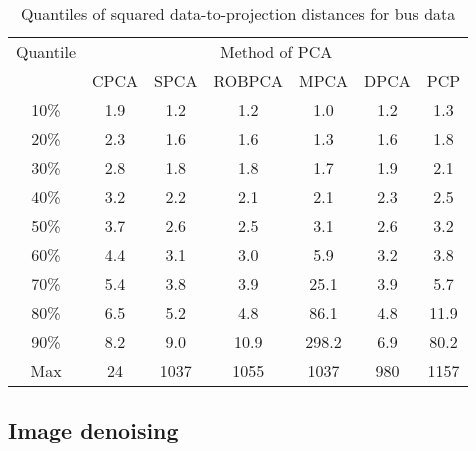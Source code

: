 
\begin{table}[t]
\centering
    \begin{tabular}{c|cccccc}
    \hline
    Quantile & \multicolumn{6}{c}{Method of PCA}         \\ \cline{2-7}
    ~                   & CPCA     & SPCA & ROBPCA & MPCA & DPCA & PCP\\\hline 
    10\%      & 1.9       & 1.2       & 1.2    & 1.0       & 1.2       & 1.3\\
    20\%      & 2.3       & 1.6       & 1.6    & 1.3       & 1.6       & 1.8\\
    30\%      & 2.8       & 1.8       & 1.8    & 1.7       & 1.9       & 2.1\\
    40\%      & 3.2       & 2.2       & 2.1    & 2.1       & 2.3       & 2.5\\
    50\%      & 3.7       & 2.6       & 2.5    & 3.1       & 2.6       & 3.2\\
    60\%      & 4.4       & 3.1       & 3.0    & 5.9       & 3.2       & 3.8\\
    70\%      & 5.4       & 3.8       & 3.9    & 25.1      & 3.9       & 5.7\\
    80\%      & 6.5       & 5.2       & 4.8    & 86.1      & 4.8       & 11.9\\
    90\%      & 8.2       & 9.0       & 10.9   & 298.2     & 6.9      & 80.2\\
    Max       & 24        & 1037      & 1055   & 1037      & 980      & 1157\\\hline
    \end{tabular}
    \caption{Quantiles of squared data-to-projection distances for bus data}
    \label{table:bus_table2}
\end{table}


\subsection{Image denoising}
